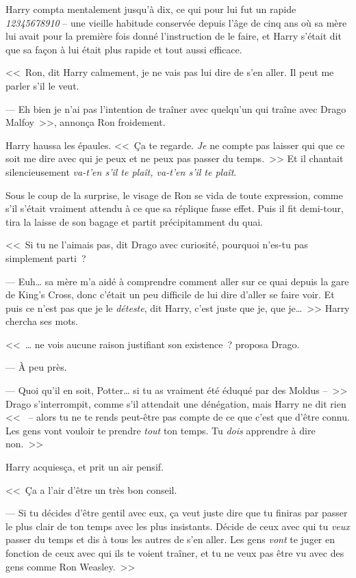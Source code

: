 Harry compta mentalement jusqu'à dix, ce qui pour lui fut un rapide \emph{12345678910} -- une vieille habitude conservée depuis l'âge de cinq ans où sa mère lui avait pour la première fois donné l'instruction de le faire, et Harry s'était dit que sa façon à lui était plus rapide et tout aussi efficace.

<<~Ron, dit Harry calmement, je ne vais pas lui dire de s'en aller. Il peut me parler s'il le veut.

--- Eh bien je n'ai pas l'intention de traîner avec quelqu'un qui traîne avec Drago Malfoy~>>, annonça Ron froidement.

Harry haussa les épaules. <<~Ça te regarde. \emph{Je} ne compte pas laisser qui que ce soit me dire avec qui je peux et ne peux pas passer du temps.~>> Et il chantait silencieusement \emph{va-t'en s'il te plaît, va-t'en s'il te plaît}.

Sous le coup de la surprise, le visage de Ron se vida de toute expression, comme s'il s'était vraiment attendu à ce que sa réplique fasse effet. Puis il fit demi-tour, tira la laisse de son bagage et partit précipitamment du quai.

<<~Si tu ne l'aimais pas, dit Drago avec curiosité, pourquoi n'es-tu pas simplement parti~?

--- Euh… sa mère m'a aidé à comprendre comment aller sur ce quai depuis la gare de King's Cross, donc c'était un peu difficile de lui dire d'aller se faire voir. Et puis ce n'est pas que je le \emph{déteste}, dit Harry, c'est juste que je, que je…~>> Harry chercha ses mots.

<<~… ne vois aucune raison justifiant son existence~? proposa Drago.

--- À peu près.

--- Quoi qu'il en soit, Potter… si tu as vraiment été éduqué par des Moldus --~>> Drago s'interrompit, comme s'il attendait une dénégation, mais Harry ne dit rien <<~ -- alors tu ne te rends peut-être pas compte de ce que c'est que d'être connu. Les gens vont vouloir te prendre \emph{tout} ton temps. Tu \emph{dois} apprendre à dire non.~>>

Harry acquiesça, et prit un air pensif.

<<~Ça a l'air d'être un très bon conseil.

--- Si tu décides d'être gentil avec eux, ça veut juste dire que tu finiras par passer le plus clair de ton temps avec les plus insistants. Décide de ceux avec qui tu \emph{veux} passer du temps et dis à tous les autres de s'en aller. Les gens \emph{vont} te juger en fonction de ceux avec qui ils te voient traîner, et tu ne veux pas être vu avec des gens comme Ron Weasley.~>>

